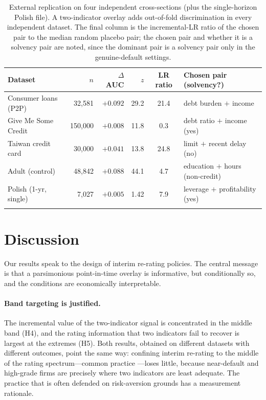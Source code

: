 \documentclass[pdflatex,sn-mathphys-ay]{sn-jnl}
\begin{document}
\begin{table}[t]
\centering
\caption{External replication on four independent cross-sections (plus the single-horizon Polish file).
A two-indicator overlay adds out-of-fold discrimination in every independent dataset. The final column
is the incremental-LR ratio of the chosen pair to the median random placebo pair; the chosen pair and
whether it is a solvency pair are noted, since the dominant pair is a solvency pair only in the
genuine-default settings.}
\label{tab:multidata}
\small
\begin{tabular}{@{}lrrrcl@{}}
\toprule
Dataset & $n$ & $\Delta$AUC & $z$ & LR ratio & Chosen pair (solvency?) \\
\midrule
Consumer loans (P2P)       & 32{,}581  & $+0.092$ & 29.2 & 21.4 & debt burden $+$ income \\
Give Me Some Credit         & 150{,}000 & $+0.008$ & 11.8 & 0.3  & debt ratio $+$ income (yes) \\
Taiwan credit card          & 30{,}000  & $+0.041$ & 13.8 & 24.8 & limit $+$ recent delay (no) \\
Adult (control)             & 48{,}842  & $+0.088$ & 44.1 & 4.7  & education $+$ hours (non-credit) \\
\midrule
Polish (1-yr, single)       & 7{,}027   & $+0.005$ & 1.42 & 7.9 & leverage $+$ profitability (yes) \\
\botrule
\end{tabular}
\end{table}

\section{Discussion}\label{sec:discussion}

Our results speak to the design of interim re-rating policies. The central message is that a
parsimonious point-in-time overlay is informative, but conditionally so, and the conditions are
economically interpretable.

\paragraph{Band targeting is justified.} The incremental value of the two-indicator signal is
concentrated in the middle band (H4), and the rating information that two indicators fail to recover is
largest at the extremes (H5). Both results, obtained on different datasets with different outcomes,
point the same way: confining interim re-rating to the middle of the rating spectrum---common practice
---loses little, because near-default and high-grade firms are precisely where two indicators are least
adequate. The practice that is often defended on risk-aversion grounds has a measurement rationale.
\end{document}
